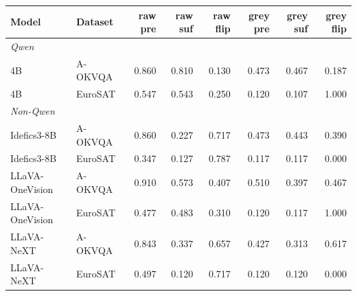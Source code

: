 \begin{tabular}{llrrrrrr}
\toprule
Model & Dataset & raw pre & raw suf & raw flip & grey pre & grey suf & grey flip \\
\midrule
\multicolumn{8}{l}{\textit{Qwen}} \\
4B & A-OKVQA & 0.860 & 0.810 & 0.130 & 0.473 & 0.467 & 0.187 \\
4B & EuroSAT & 0.547 & 0.543 & 0.250 & 0.120 & 0.107 & 1.000 \\
\midrule
\multicolumn{8}{l}{\textit{Non-Qwen}} \\
Idefics3-8B & A-OKVQA & 0.860 & 0.227 & 0.717 & 0.473 & 0.443 & 0.390 \\
Idefics3-8B & EuroSAT & 0.347 & 0.127 & 0.787 & 0.117 & 0.117 & 0.000 \\
LLaVA-OneVision & A-OKVQA & 0.910 & 0.573 & 0.407 & 0.510 & 0.397 & 0.467 \\
LLaVA-OneVision & EuroSAT & 0.477 & 0.483 & 0.310 & 0.120 & 0.117 & 1.000 \\
LLaVA-NeXT & A-OKVQA & 0.843 & 0.337 & 0.657 & 0.427 & 0.313 & 0.617 \\
LLaVA-NeXT & EuroSAT & 0.497 & 0.120 & 0.717 & 0.120 & 0.120 & 0.000 \\
\bottomrule
\end{tabular}
